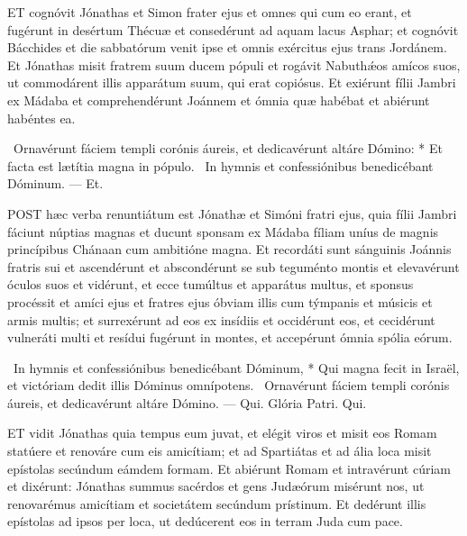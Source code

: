 
\lettrine[lines=2]{E}{T} cognóvit Jónathas et Simon frater ejus et omnes qui cum eo erant, et fugérunt in desértum Thécuæ et consedérunt ad aquam lacus Asphar; et cognóvit Bácchides et die sabbatórum venit ipse et omnis exércitus ejus trans Jordánem. Et Jónathas misit fratrem suum ducem pópuli et rogávit Nabuthǽos amícos suos, ut commodárent illis apparátum suum, qui erat copiósus. Et exiérunt fílii Jambri ex Mádaba et comprehendérunt Joánnem et ómnia quæ habébat et abiérunt habéntes ea.

\R\ Ornavérunt fáciem templi corónis áureis, et dedicavérunt altáre Dómino: * Et facta est lætítia magna in pópulo. \V\ In hymnis et confessiónibus benedicébant Dóminum. — Et.



\lettrine[lines=2]{P}{OST} hæc verba renuntiátum est Jónathæ et Simóni fratri ejus, quia fílii Jambri fáciunt núptias magnas et ducunt sponsam ex Mádaba fíliam uníus de magnis princípibus Chánaan cum ambitióne magna. Et recordáti sunt sánguinis Joánnis fratris sui et ascendérunt et abscondérunt se sub teguménto montis et elevavérunt óculos suos et vidérunt, et ecce tumúltus et apparátus multus, et sponsus procéssit et amíci ejus et fratres ejus óbviam illis cum týmpanis et músicis et armis multis; et surrexérunt ad eos ex insídiis et occidérunt eos, et cecidérunt vulneráti multi et resídui fugérunt in montes, et accepérunt ómnia spólia eórum.

\R\ In hymnis et confessiónibus benedicébant Dóminum, * Qui magna fecit in Israël, et victóriam dedit illis Dóminus omnípotens. \V\ Ornavérunt fáciem templi corónis áureis, et dedicavérunt altáre Dómino. — Qui. Glória Patri. Qui.




\lettrine[lines=2]{E}{T} vidit Jónathas quia tempus eum juvat, et elégit viros et misit eos Romam statúere et renováre cum eis amicítiam; et ad Spartiátas et ad ália loca misit epístolas secúndum eámdem formam. Et abiérunt Romam et intravérunt cúriam et dixérunt: Jónathas summus sacérdos et gens Judæórum misérunt nos, ut renovarémus amicítiam et societátem secúndum prístinum. Et dedérunt illis epístolas ad ipsos per loca, ut dedúcerent eos in terram Juda cum pace.

